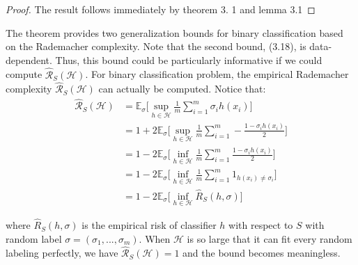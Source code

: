 \begin{proof}
	The result follows immediately by theorem 3. 1 and lemma 3.1
\end{proof}
%
%
%
%
%
%
%
%
%
%
%
%
%
%
The theorem provides two generalization bounds for binary classification based on the Rademacher complexity. Note that the second bound, (3.18), is data-dependent. Thus, this bound could be particularly informative if we could compute $\hat{\mathcal{R}}_{S}(\mathcal{H})$.
For binary classification problem, the empirical Rademacher complexity $\hat{\mathcal{R}}_{S}(\mathcal{H})$ can actually be computed. Notice that:
\begin{align}
\hat{\mathcal{R}}_{S}(\mathcal{H}) &= \mathbb{E}_{\sigma} \big[\sup_{h\in \mathcal{H}}\frac{1}{m}\sum_{i=1}^{m}\sigma_i h(x_i)\big]\\
&= 1+2\mathbb{E}_{\sigma} \big[\sup_{h\in \mathcal{H}}\frac{1}{m}\sum_{i=1}^{m}-\frac{1-\sigma_i h(x_i)}{2}\big]\\
&= 1-2\mathbb{E}_{\sigma} \big[\inf_{h\in \mathcal{H}}\frac{1}{m}\sum_{i=1}^{m} \frac{1-\sigma_i h(x_i)}{2}\big]\\
&= 1-2\mathbb{E}_{\sigma} \big[\inf_{h\in \mathcal{H}}\frac{1}{m}\sum_{i=1}^{m} 1_{h(x_i)\ne \sigma_i} \big] \\
&= 1-2\mathbb{E}_{\sigma} \big[\inf_{h\in \mathcal{H}}\hat{R}_S(h,\sigma)\big]
\end{align}

where $\hat{R}_S(h,\sigma)$ is the empirical risk of classifier $h$ with respect to $S$ with random label $\sigma=(\sigma_1,...,\sigma_m)$. When $\mathcal{H}$ is so large that it can fit every random labeling perfectly, we have $\hat{\mathcal{R}}_{S}(\mathcal{H})=1$ and the bound becomes meaningless.\\

